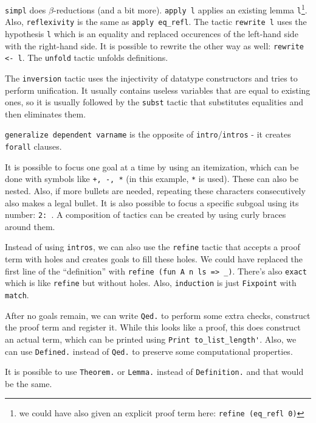\lstinline{simpl} does $\beta$-reductions (and a bit more). \lstinline{apply l} applies
an existing lemma \lstinline{l}\footnote{we could have also given an explicit proof term here: \lstinline{refine (eq_refl 0)}}. Also,
\lstinline{reflexivity} is the same as \lstinline{apply eq_refl}.
The tactic \lstinline{rewrite l} uses the hypothesis \lstinline{l} which is an equality and replaced occurences of the left-hand
side with the right-hand side. It is possible to rewrite the other way as well: \lstinline{rewrite <- l}.
The \lstinline{unfold} tactic unfolds definitions.

The \lstinline{inversion} tactic uses the injectivity of datatype constructors and tries to perform unification. It usually
contains useless variables that are equal to existing ones, so it is usually followed by the \lstinline{subst} tactic that substitutes
equalities and then eliminates them. 

\lstinline{generalize dependent varname} is the opposite of \lstinline{intro}/\lstinline{intros} - it creates \lstinline{forall}
clauses.

It is possible to focus one goal at a time by using an itemization, which can be done with symbols like \lstinline{+, -, *} (in this example,
\lstinline{*} is used). These can also be nested. Also, if more bullets are needed, repeating these characters consecutively also makes a 
legal bullet. It is also possible to focus a specific subgoal using its number: \lstinline{2: }. A composition of tactics
can be created by using curly braces around them.

Instead of using \lstinline{intros}, we can also use the \lstinline{refine} tactic that accepts a proof term with holes and 
creates goals to fill these holes. We could have replaced the first line of the ``definition'' with \lstinline{refine (fun A n ls => _)}. 
There's also \lstinline{exact} which is like \lstinline{refine} but without holes.
Also, \lstinline{induction} is just \lstinline{Fixpoint} with \lstinline{match}.

After no goals remain, we can write \lstinline{Qed.} to perform some extra checks, construct the proof term and register it.
While this looks like a proof, this does construct an actual term, which can be printed using \lstinline{Print to_list_length'}.
Also, we can use \lstinline{Defined.} instead of \lstinline{Qed.} to preserve some computational properties.

It is possible to use \lstinline{Theorem.} or \lstinline{Lemma.} instead of \lstinline{Definition.} and that would be the same.

